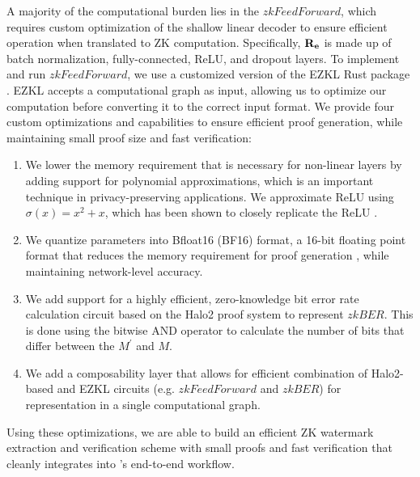 A majority of the computational burden lies in the $zkFeedForward$, which requires custom optimization of the shallow linear decoder to ensure efficient operation when translated to ZK computation. Specifically, $\bf{R}_e$ is made up of batch normalization, fully-connected, ReLU, and dropout layers. To implement and run $zkFeedForward$, we use a customized version of the EZKL Rust package \cite{ezkl}. EZKL accepts a computational graph as input, allowing us to optimize our computation before converting it to the correct input format. We provide four custom optimizations and capabilities to ensure efficient proof generation, while maintaining small proof size and fast verification:
\begin{enumerate}
    \item We lower the memory requirement that is necessary for non-linear layers by adding support for polynomial approximations, which is an important technique in privacy-preserving applications. We approximate ReLU using $\sigma(x)=x^2+x$, which has been shown to closely replicate the ReLU \cite{ali2020polynomial}.
    \item We quantize parameters into Bfloat16 (BF16) format, a 16-bit floating point format that reduces the memory requirement for proof generation \cite{burgess2019bfloat16}, while maintaining network-level accuracy.
    \item We add support for a highly efficient, zero-knowledge bit error rate calculation circuit based on the Halo2 proof system to represent $zkBER$. This is done using the bitwise AND operator to calculate the number of bits that differ between the $M^\prime$ and $M$.
    \item We add a composability layer that allows for efficient combination of Halo2-based and EZKL circuits (e.g. $zkFeedForward$ and $zkBER$) for representation in a single computational graph.
\end{enumerate}

Using these optimizations, we are able to build an efficient ZK watermark extraction and verification scheme with small proofs and fast verification that cleanly integrates into \sys{}'s end-to-end workflow.

